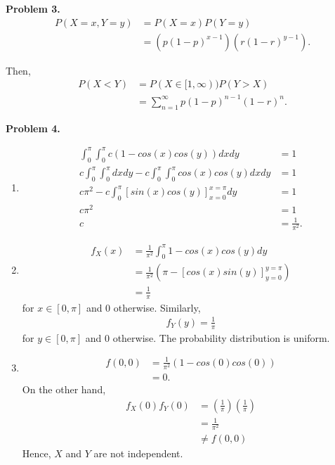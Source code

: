 \documentclass{article}
\begin{document}
\textbf{Problem 3.}
\begin{align}
    P(X=x,Y=y) & = P(X=x)P(Y=y) \\
    & = \left(p(1-p)^{x-1}\right) \left(r(1-r)^{y-1}\right).
\end{align}

Then,
\begin{align}
    P(X<Y) & = P(X\in [1,\infty))P(Y>X) \\
    & = \sum_{n=1}^{\infty}p(1-p)^{n-1}(1-r)^n.
\end{align}
\bigbreak

\textbf{Problem 4.}
\begin{enumerate}[label={(\alph*)}]
    \item 
    \begin{align}
        \int_{0}^{\pi}\int_{0}^{\pi}c(1-cos(x)cos(y))dxdy & = 1 \\
        c\int_{0}^{\pi}\int_{0}^{\pi}dxdy - c\int_{0}^{\pi}\int_{0}^{\pi}cos(x)cos(y)dxdy & = 1 \\
        c\pi^2 - c\int_{0}^{\pi}\left[sin(x)cos(y)\right]_{x=0}^{x=\pi}dy & = 1\\
        c\pi^2 & = 1 \\
        c & = \frac{1}{\pi^2}.
    \end{align}

    \item 
    \begin{align}
        f_X(x) & = \frac{1}{\pi^2}\int_{0}^{\pi}1-cos(x)cos(y)dy \\
        & = \frac{1}{\pi^2}\left(\pi - \left[cos(x)sin(y)\right]_{y=0}^{y=\pi}\right) \\
        & = \frac{1}{\pi} 
    \end{align}
    for $x\in [0,\pi]$ and 0 otherwise. Similarly,
    \begin{align}
        f_Y(y) = \frac{1}{\pi}
    \end{align}
    for $y\in [0,\pi]$ and 0 otherwise. The probability distribution is uniform.

    \item 
    \begin{align}
        f(0,0) & = \frac{1}{\pi^2}\left(1-cos(0)cos(0)\right) \\
        & = 0.
    \end{align}
    On the other hand,
    \begin{align}
        f_X(0)f_Y(0) & = \left(\frac{1}{\pi}\right)\left(\frac{1}{\pi}\right) \\
        & = \frac{1}{\pi^2} \\
        & \neq f(0,0)
    \end{align}
    Hence, $X$ and $Y$ are not independent.
\end{enumerate}
\bigbreak
\end{document}
